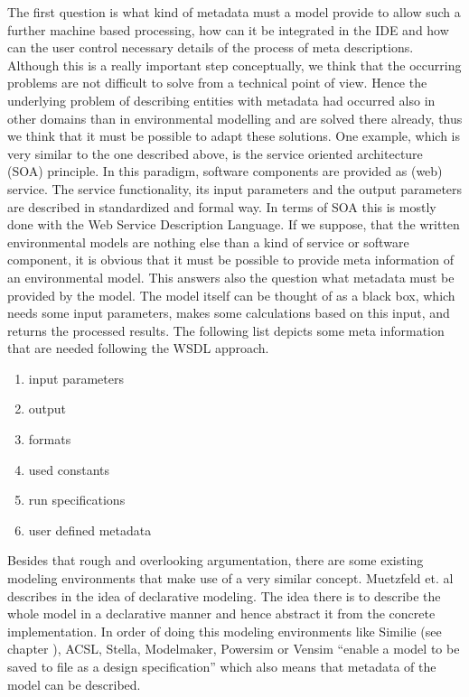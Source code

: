 The first question is what kind of metadata must a model provide to allow such a further machine based processing, how can it be integrated in the IDE and how can the user control necessary details of the process of meta descriptions.
Although this is a really important step conceptually, we think that the occurring problems are not difficult to solve from a technical point of view. Hence the underlying problem of describing entities with metadata had occurred also in other domains than in environmental modelling and are solved there already, thus we think that it must be possible to adapt these solutions.
One example, which is very similar to the one described above, is the service oriented architecture (SOA) principle. In this paradigm, software components are provided as (web) service. The service functionality, its input parameters and the output parameters are described in standardized and formal way. In terms of SOA this is mostly done with the Web Service Description Language. If we suppose, that the written environmental models are nothing else than a kind of service or software component, it is obvious that it must be possible to provide meta information of an environmental model. This answers also the question what metadata must be provided by the model. The model itself can be thought of as a black box, which needs some input parameters, makes some calculations based on this input, and returns the processed results. The following list depicts some meta information that are needed following the WSDL approach. \autocite{dsl:muetzelfeldt}

\begin{enumerate}
\item input parameters
\item output
\item formats
\item used constants
\item run specifications
\item user defined metadata
\end{enumerate}


Besides that rough and overlooking argumentation, there are some existing modeling environments that make use of a very similar concept. Muetzfeld et. al describes in \autocite{dsl:muetzelfeldt} the idea of declarative modeling. The idea there is to describe the whole model in a declarative manner and hence abstract it from the concrete implementation. In order of doing this modeling environments like Similie (see chapter ), ACSL, Stella, Modelmaker, Powersim or Vensim ``enable a model to be saved to file as a design specification'' \autocite[32]{dsl:muetzelfeldt} which also means that metadata of the model can be described.


